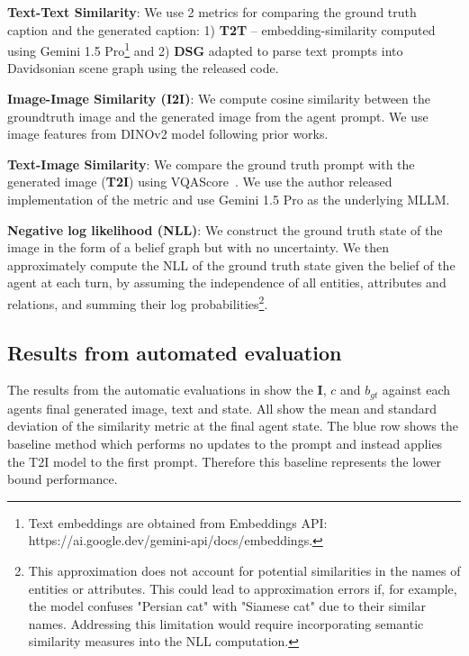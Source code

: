 \textbf{Text-Text Similarity}:  We use 2 metrics for comparing the ground truth caption and the generated caption: 1) \textbf{T2T} -- embedding-similarity computed using Gemini 1.5 Pro\footnote{Text embeddings are obtained from Embeddings API: https://ai.google.dev/gemini-api/docs/embeddings.} and 2) \textbf{DSG} \citep{cho2024davidsonianscenegraphimproving} adapted to parse text prompts into Davidsonian scene graph using the released code.

\textbf{Image-Image Similarity (I2I)}: We compute cosine similarity between the groundtruth image and the generated image from the agent prompt. We use image features from DINOv2 \citep{oquab2024dinov2learningrobustvisual} model following prior works. 

\textbf{Text-Image Similarity}: We compare  the ground truth prompt with the generated image (\textbf{T2I}) using  VQAScore~\citep{lin2024evaluatingtexttovisualgenerationimagetotext}. We use the author released implementation of the metric and use Gemini 1.5 Pro as the underlying MLLM. %

\textbf{Negative log likelihood (NLL)}: We construct the ground truth state of the image in the form of a belief graph but with no uncertainty. We then approximately compute the NLL of the ground truth state given the belief of the agent at each turn, by assuming the independence of all entities, attributes and relations, and summing their log probabilities\footnote{This approximation does not account for potential similarities in the names of entities or attributes. This could lead to approximation errors if, for example, the model confuses "Persian cat" with "Siamese cat" due to their similar names. Addressing this limitation would require incorporating semantic similarity measures into the NLL computation.}.

\subsection{Results from automated evaluation}

The results from the automatic evaluations in  show the $\mathbf{I}$, $c$ and $b_{gt}$ against each agents final generated image, text and state. All show the mean and standard deviation of the similarity metric at the final agent state. The blue row shows the baseline method which performs no updates to the prompt and instead applies the T2I model to the first prompt. Therefore this baseline represents the lower bound performance. 

